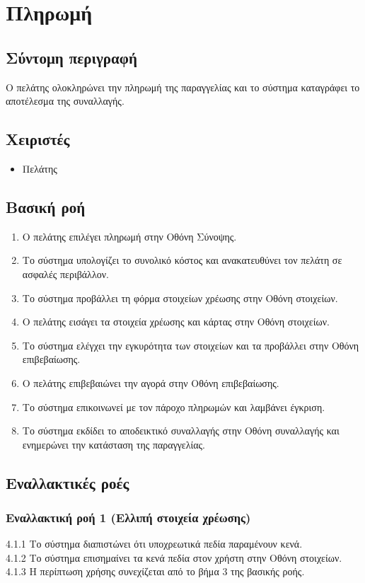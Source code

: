 \documentclass[12pt,a4paper,twoside]{book}
\begin{document}
\section{Πληρωμή}

\subsection{Σύντομη περιγραφή}
Ο πελάτης ολοκληρώνει την πληρωμή της παραγγελίας και το σύστημα καταγράφει το αποτέλεσμα της συναλλαγής.

\subsection{Χειριστές}
\begin{itemize}
    \item Πελάτης
\end{itemize}

\subsection{Βασική ροή}
\begin{enumerate}
    \item Ο πελάτης επιλέγει πληρωμή στην Οθόνη Σύνοψης.
    \item Το σύστημα υπολογίζει το συνολικό κόστος και ανακατευθύνει τον πελάτη σε ασφαλές περιβάλλον.
    \item Το σύστημα προβάλλει τη φόρμα στοιχείων χρέωσης στην Οθόνη στοιχείων.
    \item Ο πελάτης εισάγει τα στοιχεία χρέωσης και κάρτας στην Οθόνη στοιχείων.
    \item Το σύστημα ελέγχει την εγκυρότητα των στοιχείων και τα προβάλλει στην Οθόνη επιβεβαίωσης.
    \item Ο πελάτης επιβεβαιώνει την αγορά στην Οθόνη επιβεβαίωσης.
    \item Το σύστημα επικοινωνεί με τον πάροχο πληρωμών και λαμβάνει έγκριση.
    \item Το σύστημα εκδίδει το αποδεικτικό συναλλαγής στην Οθόνη συναλλαγής και ενημερώνει την κατάσταση της παραγγελίας.
\end{enumerate}

\subsection{Εναλλακτικές ροές}

\subsubsection*{Εναλλακτική ροή 1 (Ελλιπή στοιχεία χρέωσης)}
4.1.1 Το σύστημα διαπιστώνει ότι υποχρεωτικά πεδία παραμένουν κενά.\\
\hspace*{\parindent}4.1.2 Το σύστημα επισημαίνει τα κενά πεδία στον χρήστη στην Οθόνη στοιχείων.\\
\hspace*{\parindent}4.1.3 Η περίπτωση χρήσης συνεχίζεται από το βήμα 3 της βασικής ροής.
\end{document}
